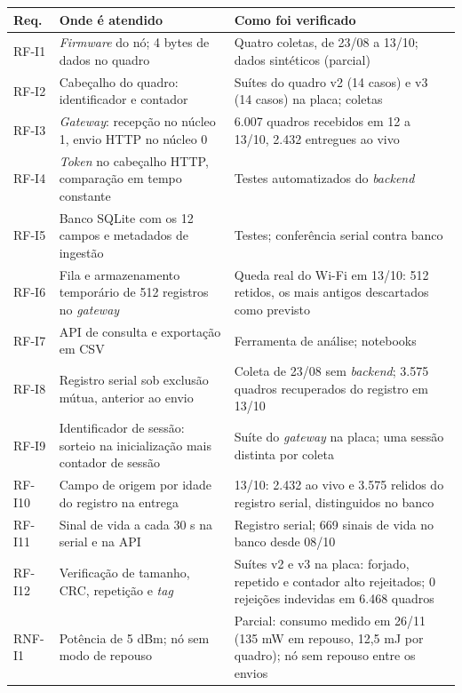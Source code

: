 \begin{quadro}[!htbp]
\centering
\caption{Rastreabilidade dos requisitos da infraestrutura}
\label{qua:rastreabilidade_infra}
\footnotesize
\begin{tabular}{lp{}p{8cm}}
\hline
\textbf{Req.} & \textbf{Onde é atendido} & \textbf{Como foi verificado} \\
\hline
RF-I1  & \textit{Firmware} do nó; 4 bytes de dados no quadro & Quatro coletas, de 23/08 a 13/10; dados sintéticos (parcial) \\
RF-I2  & Cabeçalho do quadro: identificador e contador & Suítes do quadro v2 (14 casos) e v3 (14 casos) na placa; coletas \\
RF-I3  & \textit{Gateway}: recepção no núcleo 1, envio HTTP no núcleo 0 & 6.007 quadros recebidos em 12 a 13/10, 2.432 entregues ao vivo \\
RF-I4  & \textit{Token} no cabeçalho HTTP, comparação em tempo constante & Testes automatizados do \textit{backend} \\
RF-I5  & Banco SQLite com os 12 campos e metadados de ingestão & Testes; conferência serial contra banco \\
RF-I6  & Fila e armazenamento temporário de 512 registros no \textit{gateway} & Queda real do Wi-Fi em 13/10: 512 retidos, os mais antigos descartados como previsto \\
RF-I7  & API de consulta e exportação em CSV & Ferramenta de análise; notebooks \\
RF-I8  & Registro serial sob exclusão mútua, anterior ao envio & Coleta de 23/08 sem \textit{backend}; 3.575 quadros recuperados do registro em 13/10 \\
RF-I9  & Identificador de sessão: sorteio na inicialização mais contador de sessão & Suíte do \textit{gateway} na placa; uma sessão distinta por coleta \\
RF-I10 & Campo de origem por idade do registro na entrega & 13/10: 2.432 ao vivo e 3.575 relidos do registro serial, distinguidos no banco \\
RF-I11 & Sinal de vida a cada 30 s na serial e na API & Registro serial; 669 sinais de vida no banco desde 08/10 \\
RF-I12 & Verificação de tamanho, CRC, repetição e \textit{tag} & Suítes v2 e v3 na placa: forjado, repetido e contador alto rejeitados; 0 rejeições indevidas em 6.468 quadros \\
RNF-I1 & Potência de 5 dBm; nó sem modo de repouso & Parcial: consumo medido em 26/11 (135 mW em repouso, 12,5 mJ por quadro); nó sem repouso entre os envios \\

\end{tabular}
\end{quadro}
